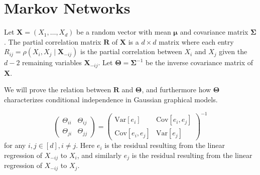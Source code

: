 \documentclass[a3paper,12pt]{extarticle} %
\begin{document}
\begin{enumerate}
\begin{enumerate}
\end{enumerate}
\end{enumerate}
\newpage
\section{Markov Networks}
Let \( \mathbf{X} = (X_1, \ldots, X_d) \) be a random vector with mean \( \boldsymbol{\mu} \) and covariance matrix \( \boldsymbol{\Sigma} \). The partial correlation matrix \( \mathbf{R} \) of \( \mathbf{X} \) is a \( d \times d \) matrix where each entry \( R_{ij} = \rho(X_i, X_j \mid \mathbf{X}_{-ij}) \) is the partial correlation between \( X_i \) and \( X_j \) given the \( d-2 \) remaining variables \( \mathbf{X}_{-ij} \). Let \( \boldsymbol{\Theta} = \boldsymbol{\Sigma}^{-1} \) be the inverse covariance matrix of \( \mathbf{X} \).

We will prove the relation between \( \mathbf{R} \) and \( \boldsymbol{\Theta} \), and furthermore how \( \boldsymbol{\Theta} \) characterizes conditional independence in Gaussian graphical models.

\[
        \begin{pmatrix}
        \Theta_{ii} & \Theta_{ij} \\
        \Theta_{ji} & \Theta_{jj}
        \end{pmatrix}
        =
        \begin{pmatrix}
        \text{Var}[e_i] & \text{Cov}[e_i, e_j] \\
        \text{Cov}[e_i, e_j] & \text{Var}[e_j]
        \end{pmatrix}^{-1}
\]
    for any \(i, j \in [d], i \neq j\). Here \(e_i\) is the residual resulting from the linear regression of \(X_{-ij}\) to \(X_i\), and similarly \(e_j\) is the residual resulting from the linear regression of \(X_{-ij}\) to \(X_j\).
\end{document}

